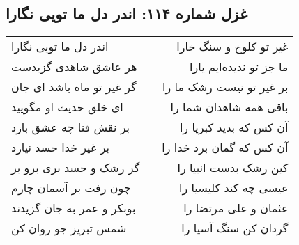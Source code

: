 \begin{center}
\section*{غزل شماره ۱۱۴: اندر دل ما تویی نگارا}
\label{sec:0114}
\begin{longtable}{l p{0.5cm} r}
اندر دل ما تویی نگارا
&&
غیر تو کلوخ و سنگ خارا
\\
هر عاشق شاهدی گزیدست
&&
ما جز تو ندیده‌ایم یارا
\\
گر غیر تو ماه باشد ای جان
&&
بر غیر تو نیست رشک ما را
\\
ای خلق حدیث او مگویید
&&
باقی همه شاهدان شما را
\\
بر نقش فنا چه عشق بازد
&&
آن کس که بدید کبریا را
\\
بر غیر خدا حسد نیارد
&&
آن کس که گمان برد خدا را
\\
گر رشک و حسد بری برو بر
&&
کین رشک بدست انبیا را
\\
چون رفت بر آسمان چارم
&&
عیسی چه کند کلیسیا را
\\
بوبکر و عمر به جان گزیدند
&&
عثمان و علی مرتضا را
\\
شمس تبریز جو روان کن
&&
گردان کن سنگ آسیا را
\\
\end{longtable}
\end{center}
